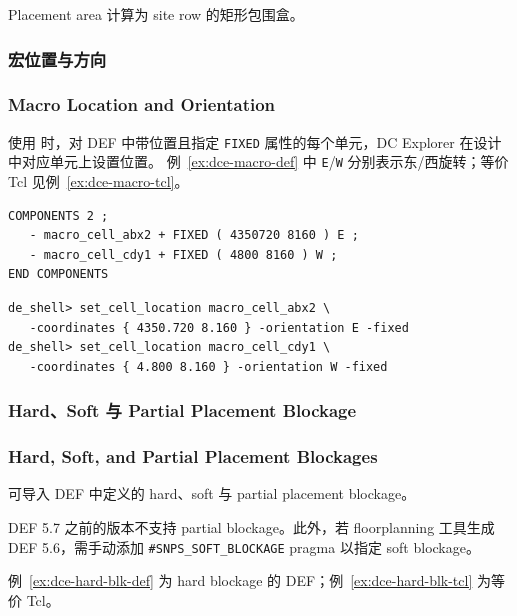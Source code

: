 Placement area 计算为 site row 的矩形包围盒。

\subsubsection{宏位置与方向}
\subsubsection*{Macro Location and Orientation}

使用  时，对 DEF 中带位置且指定 \texttt{FIXED} 属性的每个单元，DC Explorer 在设计中对应单元上设置位置。
例~\ref{ex:dce-macro-def} 中 \texttt{E}/\texttt{W} 分别表示东/西旋转；等价 Tcl 见例~\ref{ex:dce-macro-tcl}。

\begin{lstlisting}[caption={DEF 宏位置与方向},label={ex:dce-macro-def}]
COMPONENTS 2 ;
   - macro_cell_abx2 + FIXED ( 4350720 8160 ) E ;
   - macro_cell_cdy1 + FIXED ( 4800 8160 ) W ;
END COMPONENTS
\end{lstlisting}

\begin{lstlisting}[caption={等价 Tcl},label={ex:dce-macro-tcl}]
de_shell> set_cell_location macro_cell_abx2 \
   -coordinates { 4350.720 8.160 } -orientation E -fixed
de_shell> set_cell_location macro_cell_cdy1 \
   -coordinates { 4.800 8.160 } -orientation W -fixed
\end{lstlisting}

\subsubsection{Hard、Soft 与 Partial Placement Blockage}
\subsubsection*{Hard, Soft, and Partial Placement Blockages}

 可导入 DEF 中定义的 hard、soft 与 partial placement blockage。

\begin{noteBox}
DEF 5.7 之前的版本不支持 partial blockage。此外，若 floorplanning 工具生成 DEF 5.6，需手动添加 \texttt{\#SNPS\_SOFT\_BLOCKAGE} pragma 以指定 soft blockage。
\end{noteBox}

例~\ref{ex:dce-hard-blk-def} 为 hard blockage 的 DEF；例~\ref{ex:dce-hard-blk-tcl} 为等价 Tcl。


